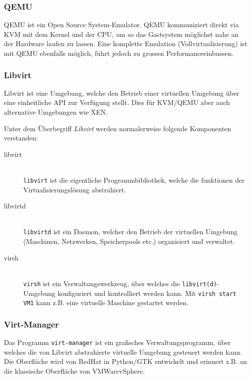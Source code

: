 \subsubsection{QEMU}
QEMU ist ein Open Source System-Emulator. QEMU kommuniziert direkt via KVM mit dem Kernel und der CPU, um so das Gastsystem möglichst nahe an der Hardware laufen zu lassen. Eine komplette Emulation (Vollvirtualisierung) ist mit QEMU ebenfalls möglich, führt jedoch zu grossen Performanceeinbussen.

\subsubsection{Libvirt}

Libvirt ist eine Umgebung, welche den Betrieb einer virtuellen Umgebung über eine einheitliche API zur Verfügung stellt. Dies für KVM/QEMU aber auch alternative Umgebungen wie XEN.

Unter dem Überbegriff \emph{Libvirt} werden normalerweise folgende Komponenten verstanden:

\begin{description}
	\item[libvirt] \hfill \\
	\lstinline|libvirt| ist die eigentliche Programmbibliothek, welche die funktionen der Virtualisierungslösung abstrahiert.
	\item[libvirtd] \hfill \\
	\lstinline|libvirtd| ist ein Daemon, welcher den Betrieb der virtuellen Umgebung (Maschinen, Netzwerken, Speicherpools etc.) organisiert und verwaltet.
	\item[virsh] \hfill \\
	\lstinline|virsh| ist ein Verwaltungswerkzeug, über welches die \lstinline|libvirt(d)|-Umgebung konfiguriert und kontrolliert werden kann. Mit \lstinline|virsh start VM1| kann z.B. eine virtuelle Maschine gestartet werden.
\end{description}

\subsubsection{Virt-Manager}

Das Programm \lstinline|virt-manager| ist ein grafisches Verwaltungsprogramm, über welches die von Libvirt abstrahierte virtuelle Umgebung gesteuert werden kann. Die Oberfläche wird von RedHat in Python/GTK entwickelt und erinnert z.B. an die klassische Oberfläche von VMWare\textregistered vSphere\texttrademark.

